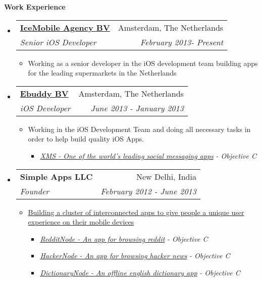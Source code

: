 \documentclass[letterpaper,11pt]{article}
\makeatletter
\newcommand{\resitem}[1]{\item #1 \vspace{-2pt}}
\newcommand{\resheading}[1]{{\large \colorbox{mygrey}{\begin{minipage}{\textwidth}{\textbf{#1 \vphantom{p\^{E}}}}\end{minipage}}}}
\newcommand{\ressubheading}[4]{
\begin{tabular*}{7.0in}{l@{\extracolsep{\fill}}r}
		\textbf{#1} & #2 \\
		\textit{#3} & \textit{#4} \\
\end{tabular*}\vspace{-6pt}}
\makeatother
\begin{document}
\vspace{0.3in}

\resheading{Work Experience}
\begin{itemize}

\item
    \ressubheading{\href{http://www.icemobile.com}{IceMobile Agency BV}}{Amsterdam, The Netherlands}{Senior iOS Developer}{February 2013- Present}
    \begin{itemize}
        \resitem{Working as a senior developer in the iOS development team building apps for the leading supermarkets in the Netherlands}
    \end{itemize}

\item
    \ressubheading{\href{http://www.ebuddy.com}{Ebuddy BV}}{Amsterdam, The Netherlands}{iOS Developer}{June 2013 - January 2013}
    \begin{itemize}
        \resitem{Working in the iOS Development Team and doing all necessary tasks in order to help build quality iOS Apps.}
	\begin{itemize}
             \resitem{\href{https://itunes.apple.com/ca/app/xms-unlimited-messaging.-better./id425154540?mt=8}{\emph{XMS - One of the world's leading social messaging apps}}\emph{ - Objective C}}
        \end{itemize}
    \end{itemize}

\item
    \ressubheading{Simple Apps LLC}{New Delhi, India}{Founder}{February 2012 - June 2013}
    \begin{itemize}
        \resitem{\href{http://www.nodemesh.net}{Building a cluster of interconnected apps to give people a unique user experience on their mobile devices}}
        \begin{itemize}
           \resitem{\href{https://itunes.apple.com/ca/app/redditnode/id555533903?mt=8}{\emph{RedditNode - An app for browsing reddit}}\emph{ - Objective C}}
            \resitem{\href{https://itunes.apple.com/ca/app/hackernode/id473882597?mt=8}{\emph{HackerNode - An app for browsing hacker news}}\emph{ - Objective C}}
            \resitem{\href{https://itunes.apple.com/ca/app/dictionarynode/id538492050?mt=8}{\emph{DictionaryNode - An offline english dictionary app}}\emph{ - Objective C}}
        \end{itemize}
    \end{itemize}


\end{itemize}
\end{document}
